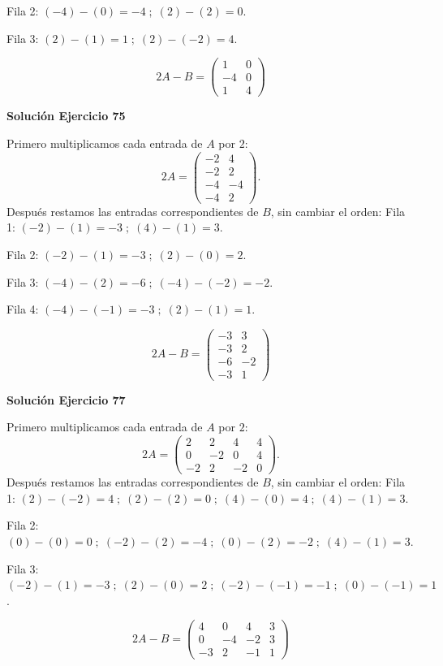 \documentclass[12pt]{article}
\theoremstyle{remark}
\begin{document}
Fila 2: $(-4)-(0)=-4\; ;\; (2)-(2)=0$.

Fila 3: $(2)-(1)=1\; ;\; (2)-(-2)=4$.

\[
\boxed{2A-B=\begin{pmatrix}1&0\\-4&0\\1&4\end{pmatrix}}
\]

\par\bigskip\noindent\textbf{Solución Ejercicio 75}\par\nobreak
Primero multiplicamos cada entrada de $A$ por $2$:
\[
2A=\begin{pmatrix}-2&4\\-2&2\\-4&-4\\-4&2\end{pmatrix}.
\]
Después restamos las entradas correspondientes de $B$, sin cambiar el orden:
Fila 1: $(-2)-(1)=-3\; ;\; (4)-(1)=3$.

Fila 2: $(-2)-(1)=-3\; ;\; (2)-(0)=2$.

Fila 3: $(-4)-(2)=-6\; ;\; (-4)-(-2)=-2$.

Fila 4: $(-4)-(-1)=-3\; ;\; (2)-(1)=1$.

\[
\boxed{2A-B=\begin{pmatrix}-3&3\\-3&2\\-6&-2\\-3&1\end{pmatrix}}
\]

\par\bigskip\noindent\textbf{Solución Ejercicio 77}\par\nobreak
Primero multiplicamos cada entrada de $A$ por $2$:
\[
2A=\begin{pmatrix}2&2&4&4\\0&-2&0&4\\-2&2&-2&0\end{pmatrix}.
\]
Después restamos las entradas correspondientes de $B$, sin cambiar el orden:
Fila 1: $(2)-(-2)=4\; ;\; (2)-(2)=0\; ;\; (4)-(0)=4\; ;\; (4)-(1)=3$.

Fila 2: $(0)-(0)=0\; ;\; (-2)-(2)=-4\; ;\; (0)-(2)=-2\; ;\; (4)-(1)=3$.

Fila 3: $(-2)-(1)=-3\; ;\; (2)-(0)=2\; ;\; (-2)-(-1)=-1\; ;\; (0)-(-1)=1$.

\[
\boxed{2A-B=\begin{pmatrix}4&0&4&3\\0&-4&-2&3\\-3&2&-1&1\end{pmatrix}}
\]
\end{document}
